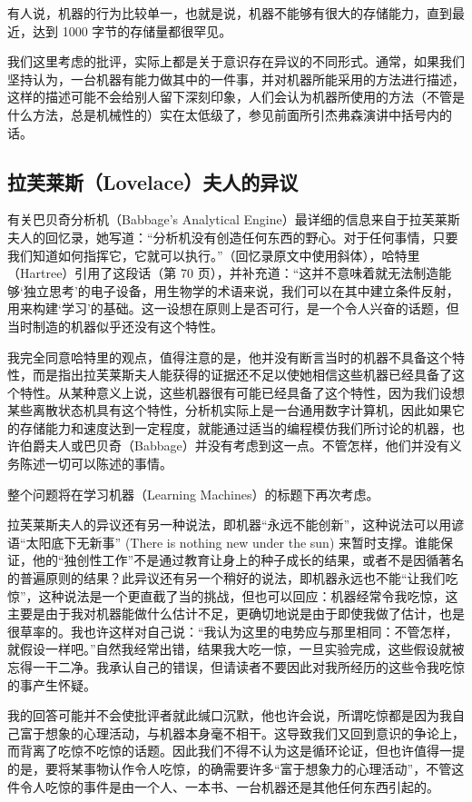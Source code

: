 \documentclass[12pt,a4paper,twoside]{article}
\begin{document}
有人说，机器的行为比较单一，也就是说，机器不能够有很大的存储能力，直到最近，达到 1000 字节的存储量都很罕见。

我们这里考虑的批评，实际上都是关于意识存在异议的不同形式。通常，如果我们坚持认为，一台机器有能力做其中的一件事，并对机器所能采用的方法进行描述，这样的描述可能不会给别人留下深刻印象，人们会认为机器所使用的方法（不管是什么方法，总是机械性的）实在太低级了，参见前面所引杰弗森演讲中括号内的话。

\subsection{拉芙莱斯（Lovelace）夫人的异议}
有关巴贝奇分析机（Babbage’s Analytical Engine）最详细的信息来自于拉芙莱斯夫人的回忆录，她写道：“分析机没有创造任何东西的野心。对于任何事情，只要我们知道如何指挥它，它就可以执行。”（回忆录原文中使用斜体），哈特里（Hartree）引用了这段话（第 70 页），并补充道：“这并不意味着就无法制造能够‘独立思考’的电子设备，用生物学的术语来说，我们可以在其中建立条件反射， 用来构建‘学习’的基础。这一设想在原则上是否可行，是一个令人兴奋的话题，但当时制造的机器似乎还没有这个特性。

我完全同意哈特里的观点，值得注意的是，他并没有断言当时的机器不具备这个特性，而是指出拉芙莱斯夫人能获得的证据还不足以使她相信这些机器已经具备了这个特性。从某种意义上说，这些机器很有可能已经具备了这个特性，因为我们设想某些离散状态机具有这个特性，分析机实际上是一台通用数字计算机，因此如果它的存储能力和速度达到一定程度，就能通过适当的编程模仿我们所讨论的机器，也许伯爵夫人或巴贝奇（Babbage）并没有考虑到这一点。不管怎样，他们并没有义务陈述一切可以陈述的事情。

整个问题将在学习机器（Learning Machines）的标题下再次考虑。

拉芙莱斯夫人的异议还有另一种说法，即机器“永远不能创新”，这种说法可以用谚语“太阳底下无新事” (There is nothing new under the sun) 来暂时支撑。谁能保证，他的“独创性工作”不是通过教育让身上的种子成长的结果，或者不是因循著名的普遍原则的结果？此异议还有另一个稍好的说法，即机器永远也不能“让我们吃惊”，这种说法是一个更直截了当的挑战，但也可以回应：机器经常令我吃惊，这主要是由于我对机器能做什么估计不足，更确切地说是由于即使我做了估计，也是很草率的。我也许这样对自己说：“我认为这里的电势应与那里相同：不管怎样，就假设一样吧。”自然我经常出错，结果我大吃一惊，一旦实验完成，这些假设就被忘得一干二净。我承认自己的错误，但请读者不要因此对我所经历的这些令我吃惊的事产生怀疑。

我的回答可能并不会使批评者就此缄口沉默，他也许会说，所谓吃惊都是因为我自己富于想象的心理活动，与机器本身毫不相干。这导致我们又回到意识的争论上，而背离了吃惊不吃惊的话题。因此我们不得不认为这是循环论证，但也许值得一提的是，要将某事物认作令人吃惊，的确需要许多“富于想象力的心理活动”，不管这件令人吃惊的事件是由一个人、一本书、一台机器还是其他任何东西引起的。
\end{document}
